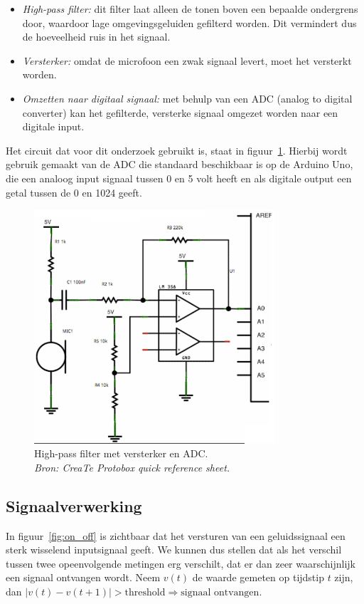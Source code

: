 \documentclass[a4paper,10pt]{article}
\begin{document}
\begin{itemize}
	\item \textit{High-pass filter:} dit filter laat alleen de tonen boven een bepaalde ondergrens door, waardoor lage omgevingsgeluiden gefilterd worden. Dit vermindert dus de hoeveelheid ruis in het signaal.
	\item \textit{Versterker:} omdat de microfoon een zwak signaal levert, moet het versterkt worden.
	\item \textit{Omzetten naar digitaal signaal:} met behulp van een ADC (analog to digital converter) kan het gefilterde, versterke signaal omgezet worden naar een digitale input.
\end{itemize}

Het circuit dat voor dit onderzoek gebruikt is, staat in figuur~\ref{fig:circuit}. Hierbij wordt gebruik gemaakt van de ADC die standaard beschikbaar is op de Arduino Uno, die een analoog input signaal tussen 0 en 5 volt heeft en als digitale output een getal tussen de 0 en 1024 geeft.

\begin{figure}[ht!]
    \centering
    \includegraphics[width=0.8\textwidth]{high_pass_filter_circuit.png}
    \caption{High-pass filter met versterker en ADC.\\\textit{Bron: CreaTe Protobox quick reference sheet.}}
    \label{fig:circuit}
\end{figure}

\subsection{Signaalverwerking}
In figuur~\ref{fig:on_off} is zichtbaar dat het versturen van een geluidssignaal een sterk wisselend inputsignaal geeft. We kunnen dus stellen dat als het verschil tussen twee opeenvolgende metingen erg verschilt, dat er dan zeer waarschijnlijk een signaal ontvangen wordt. Neem $v(t)$ de waarde gemeten op tijdstip $t$ zijn, dan $|v(t) - v(t+1)| > \text{threshold} \Rightarrow \text{signaal ontvangen}$.
\end{document}
